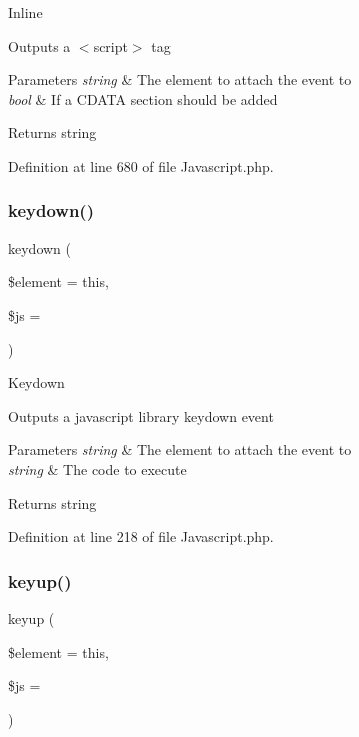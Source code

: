 Inline

Outputs a $<$script$>$ tag


\begin{DoxyParams}{Parameters}
{\em string} & The element to attach the event to \\
\hline
{\em bool} & If a C\+D\+A\+TA section should be added \\
\hline
\end{DoxyParams}
\begin{DoxyReturn}{Returns}
string 
\end{DoxyReturn}


Definition at line 680 of file Javascript.\+php.

\mbox{\label{class_c_i___javascript_ad707956fd5a0588de445d786396b33ec}} 
\subsubsection{\texorpdfstring{keydown()}{keydown()}}
{\footnotesize\ttfamily keydown (\begin{DoxyParamCaption}\item[{}]{\$element = {\ttfamily \textquotesingle{}this\textquotesingle{}},  }\item[{}]{\$js = {\ttfamily \textquotesingle{}\textquotesingle{}} }\end{DoxyParamCaption})}

Keydown

Outputs a javascript library keydown event


\begin{DoxyParams}{Parameters}
{\em string} & The element to attach the event to \\
\hline
{\em string} & The code to execute \\
\hline
\end{DoxyParams}
\begin{DoxyReturn}{Returns}
string 
\end{DoxyReturn}


Definition at line 218 of file Javascript.\+php.

\mbox{\label{class_c_i___javascript_a8c6e3a3b521c059cfd6799b3dc73d0d6}} 
\subsubsection{\texorpdfstring{keyup()}{keyup()}}
{\footnotesize\ttfamily keyup (\begin{DoxyParamCaption}\item[{}]{\$element = {\ttfamily \textquotesingle{}this\textquotesingle{}},  }\item[{}]{\$js = {\ttfamily \textquotesingle{}\textquotesingle{}} }\end{DoxyParamCaption})}

